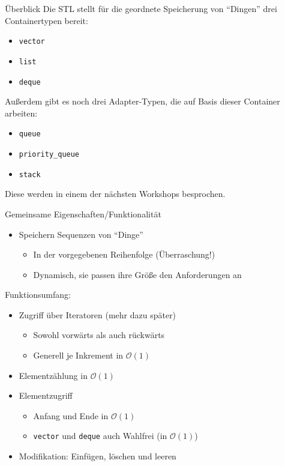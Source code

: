 \begin{frame}[fragile]{Überblick}
	Die STL stellt für die geordnete Speicherung von \enquote{Dingen} drei Containertypen bereit:
	\begin{itemize}
		\item \verb|vector|
		\item \verb|list|
		\item \verb|deque|
	\end{itemize}
	
	\pause
	
	Außerdem gibt es noch drei Adapter-Typen, die auf Basis dieser Container arbeiten:
	\begin{itemize}
		\item \verb|queue|
		\item \verb|priority_queue|
		\item \verb|stack|
	\end{itemize}
	
	\pause
	
	Diese werden in einem der nächsten Workshops besprochen.
\end{frame}

\begin{frame}[fragile]{Gemeinsame Eigenschaften/Funktionalität}
	\begin{itemize}
		\item Speichern Sequenzen von \enquote{Dinge}
		\begin{itemize}
			\item In der vorgegebenen Reihenfolge (Überraschung!)
			\pause
			\item Dynamisch, sie passen ihre Größe den Anforderungen an
		\end{itemize}
	\end{itemize}
	
	\pause
	
	Funktionsumfang:
	\begin{itemize}
		\item Zugriff über Iteratoren (mehr dazu später)
		\begin{itemize}
			\item Sowohl vorwärts als auch rückwärts
			\item Generell je Inkrement in $\mathcal{O}(1)$
		\end{itemize}
		\pause
		\item Elementzählung in $\mathcal{O}(1)$
		\pause
		\item Elementzugriff
		\begin{itemize}
			\item Anfang und Ende in $\mathcal{O}(1)$
			\item \verb|vector| und \verb|deque| auch Wahlfrei (in $\mathcal{O}(1)$)
		\end{itemize}
		\pause
		\item Modifikation: Einfügen, löschen und leeren
	\end{itemize}
\end{frame}

